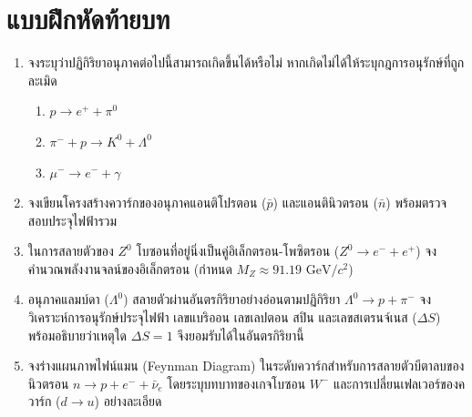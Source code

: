 \section{แบบฝึกหัดท้ายบท}
\begin{enumerate}
    \item จงระบุว่าปฏิกิริยาอนุภาคต่อไปนี้สามารถเกิดขึ้นได้หรือไม่ หากเกิดไม่ได้ให้ระบุกฎการอนุรักษ์ที่ถูกละเมิด
    \begin{enumerate}
        \item $p \to e^+ + \pi^0$
        \item $\pi^- + p \to K^0 + \Lambda^0$
        \item $\mu^- \to e^- + \gamma$
    \end{enumerate}
    \item จงเขียนโครงสร้างควาร์กของอนุภาคแอนติโปรตอน ($\bar{p}$) และแอนตินิวตรอน ($\bar{n}$) พร้อมตรวจสอบประจุไฟฟ้ารวม
    \item ในการสลายตัวของ $Z^0$ โบซอนที่อยู่นิ่งเป็นคู่อิเล็กตรอน-โพซิตรอน ($Z^0 \to e^- + e^+$) จงคำนวณพลังงานจลน์ของอิเล็กตรอน (กำหนด $M_Z \approx 91.19\text{ GeV}/c^2$)
    \item อนุภาคแลมบ์ดา ($\Lambda^0$) สลายตัวผ่านอันตรกิริยาอย่างอ่อนตามปฏิกิริยา $\Lambda^0 \to p + \pi^-$ จงวิเคราะห์การอนุรักษ์ประจุไฟฟ้า เลขแบริออน เลขเลปตอน สปิน และเลขสเตรนจ์เนส ($\Delta S$) พร้อมอธิบายว่าเหตุใด $\Delta S = 1$ จึงยอมรับได้ในอันตรกิริยานี้
    \item จงร่างแผนภาพไฟน์แมน (Feynman Diagram) ในระดับควาร์กสำหรับการสลายตัวบีตาลบของนิวตรอน $n \to p + e^- + \bar{\nu}_e$ โดยระบุบทบาทของเกจโบซอน $W^-$ และการเปลี่ยนเฟลเวอร์ของควาร์ก ($d \to u$) อย่างละเอียด
\end{enumerate}
